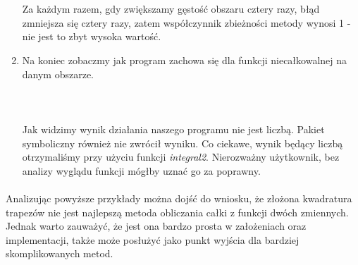 \documentclass{article}
\begin{document}
\begin{enumerate}
{{    }
}\\\\
Za każdym razem, gdy zwiększamy gęstość obszaru cztery razy, błąd zmniejsza się cztery razy, zatem współczynnik zbieżności metody wynosi 1 - nie jest to zbyt wysoka wartość.
\item Na koniec zobaczmy jak program zachowa się dla funkcji niecałkowalnej na danym obszarze.\\\\
\noindent{}\\\\
Jak widzimy wynik działania naszego programu nie jest liczbą. Pakiet symboliczny również nie zwrócił wyniku. Co ciekawe, wynik będący liczbą otrzymaliśmy przy użyciu funkcji \textit{integral2}. Nierozważny użytkownik, bez analizy wyglądu funkcji mógłby uznać go za poprawny.
\end{enumerate}
\paragraph{}
Analizując powyższe przykłady można dojść do wniosku, że złożona kwadratura trapezów nie jest najlepszą metoda obliczania całki z funkcji dwóch zmiennych. Jednak warto zauważyć, że jest ona bardzo prosta w założeniach oraz implementacji, także może posłużyć jako punkt wyjścia dla bardziej skomplikowanych metod.
\end{document}
